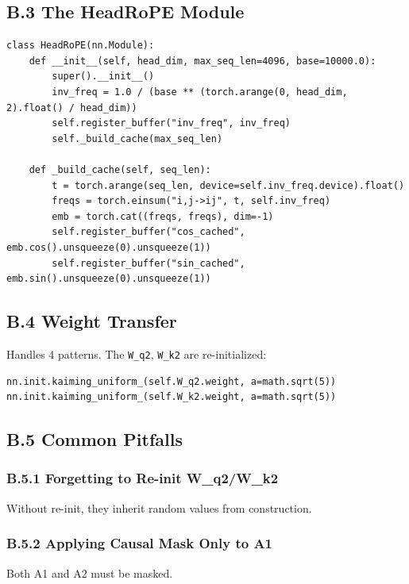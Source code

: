 \subsection{B.3 The HeadRoPE Module}

\begin{lstlisting}
class HeadRoPE(nn.Module):
    def __init__(self, head_dim, max_seq_len=4096, base=10000.0):
        super().__init__()
        inv_freq = 1.0 / (base ** (torch.arange(0, head_dim, 2).float() / head_dim))
        self.register_buffer("inv_freq", inv_freq)
        self._build_cache(max_seq_len)
    
    def _build_cache(self, seq_len):
        t = torch.arange(seq_len, device=self.inv_freq.device).float()
        freqs = torch.einsum("i,j->ij", t, self.inv_freq)
        emb = torch.cat((freqs, freqs), dim=-1)
        self.register_buffer("cos_cached", emb.cos().unsqueeze(0).unsqueeze(1))
        self.register_buffer("sin_cached", emb.sin().unsqueeze(0).unsqueeze(1))
\end{lstlisting}

\subsection{B.4 Weight Transfer}

Handles 4 patterns. The \texttt{W\_q2}, \texttt{W\_k2} are re-initialized:

\begin{lstlisting}
nn.init.kaiming_uniform_(self.W_q2.weight, a=math.sqrt(5))
nn.init.kaiming_uniform_(self.W_k2.weight, a=math.sqrt(5))
\end{lstlisting}

\subsection{B.5 Common Pitfalls}

\subsubsection{B.5.1 Forgetting to Re-init W\_q2/W\_k2}

Without re-init, they inherit random values from construction.

\subsubsection{B.5.2 Applying Causal Mask Only to A1}

Both A1 and A2 must be masked.

